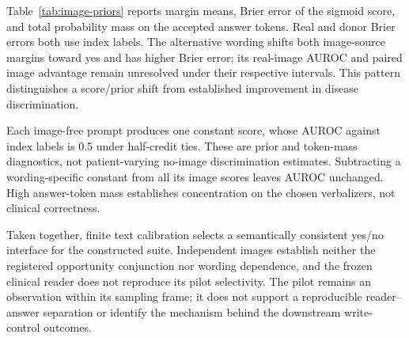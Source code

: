 Table~\ref{tab:image-priors} reports margin means, Brier error of the
sigmoid score, and total probability mass on the accepted answer tokens.
Real and donor Brier errors both use index labels. The alternative wording
shifts both image-source margins toward yes and has higher Brier error;
its real-image AUROC and paired image advantage remain unresolved under
their respective intervals. This pattern distinguishes a score/prior
shift from established improvement in disease discrimination.

\begin{table}[H]
\centering
\caption{Answer margins, predictive error, and token mass.}
\label{tab:image-priors}
\end{table}

Each image-free prompt produces one constant score, whose AUROC against
index labels is 0.5 under half-credit ties. These are prior and token-mass
diagnostics, not patient-varying no-image discrimination estimates.
Subtracting a wording-specific constant from all its image scores leaves
AUROC unchanged. High answer-token mass establishes concentration on the
chosen verbalizers, not clinical correctness.

Taken together, finite text calibration selects a semantically consistent
yes/no interface for the constructed suite. Independent images establish
neither the registered opportunity conjunction nor wording dependence,
and the frozen clinical reader does not reproduce its pilot selectivity.
The pilot remains an observation within its sampling frame; it does not
support a reproducible reader--answer separation or identify the mechanism
behind the downstream write-control outcomes.

\FloatBarrier
